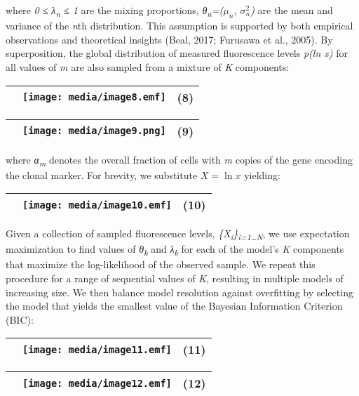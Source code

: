 where \emph{0 ≤ λ\textsubscript{n} ≤ 1} are the mixing proportions, \emph{θ\textsubscript{n}=(}\(\mu_{n}\)\emph{,} \(\sigma_{n}^{2}\)\emph{)} are the mean and variance of the \emph{n}th distribution. This assumption is supported by both empirical observations and theoretical insights (Beal, 2017; Furusawa et al., 2005). By superposition, the global distribution of measured fluorescence levels \emph{p(ln x)} for all values of \emph{m} are also sampled from a mixture of \emph{K} components:

\begin{longtable}[]{@{}lll@{}}
\toprule
& \texttt{[image: media/image8.emf]} & (8)\tabularnewline
\bottomrule
\end{longtable}

\begin{longtable}[]{@{}lll@{}}
\toprule
& \texttt{[image: media/image9.png]} & (9)\tabularnewline
\bottomrule
\end{longtable}

where \emph{α\textsubscript{m}} denotes the overall fraction of cells with \emph{m} copies of the gene encoding the clonal marker. For brevity, we substitute \(X = \ln x\) yielding:

\begin{longtable}[]{@{}lll@{}}
\toprule
& \texttt{[image: media/image10.emf]} & (10)\tabularnewline
\bottomrule
\end{longtable}

Given a collection of sampled fluorescence levels, \emph{\{X\textsubscript{i}\}\textsubscript{i=1\ldots{}N}}, we use expectation maximization to find values of \emph{θ\textsubscript{k}} and \emph{λ\textsubscript{k}} for each of the model's \emph{K} components that maximize the log-likelihood of the observed sample. We repeat this procedure for a range of sequential values of \emph{K}, resulting in multiple models of increasing size. We then balance model resolution against overfitting by selecting the model that yields the smallest value of the Bayesian Information Criterion (BIC):

\begin{longtable}[]{@{}lll@{}}
\toprule
& \texttt{[image: media/image11.emf]} & (11)\tabularnewline
\bottomrule
\end{longtable}

\begin{longtable}[]{@{}lll@{}}
\toprule
& \texttt{[image: media/image12.emf]} & (12)\tabularnewline
\bottomrule
\end{longtable}

